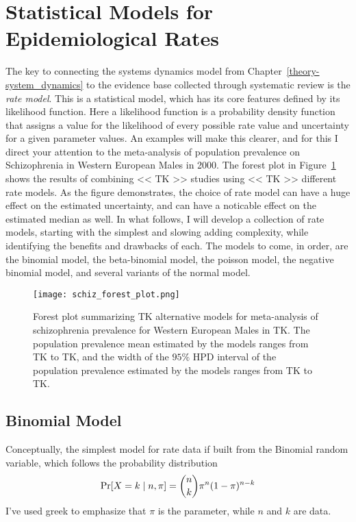 \section{Statistical Models for Epidemiological Rates}
\label{theory-rate_model}

The key to connecting the systems dynamics model from
Chapter~\ref{theory-system_dynamics} to the evidence base collected
through systematic review is the \emph{rate model}.  This is a
statistical model, which has its core features defined by its
likelihood function.  Here a likelihood function is a 
probability density function that assigns a value for the likelihood
of every possible rate value and uncertainty for a given parameter
values.  An examples will make this clearer, and for this I direct
your attention to the meta-analysis of
population prevalence on Schizophrenia in Western European Males in
2000.  The forest plot in
Figure~\ref{fig:theory-rate_model-schiz_forest} shows the results of
combining << TK >> studies using << TK >> different rate models.
As the figure demonstrates, the choice of rate model can have a huge effect
on the estimated uncertainty, and can have a noticable effect on the estimated
median as well. In what follows, I will develop a collection of rate models, starting with the
simplest and slowing adding complexity, while identifying the benefits
and drawbacks of each.  The models to come, in order, are the binomial model, the
beta-binomial model, the poisson model, the negative binomial model,
and several variants of the normal model.

\begin{figure}
\begin{center}
\texttt{[image: schiz\_forest\_plot.png]}
\end{center}
\caption{Forest plot summarizing TK alternative models for
  meta-analysis of schizophrenia prevalence for Western European Males
  in TK.  The population prevalence mean estimated by the models ranges from
  TK to TK, and the width of the $95\%$ HPD interval of the
  population prevalence estimated by the models ranges from TK
  to TK.}
\label{fig:theory-rate_model-schiz_forest}
\end{figure}

\subsection{Binomial Model}
Conceptually, the simplest model for rate data if built from the
Binomial random variable, which follows the probability distribution
\[
\operatorname{Pr}[X=k\;|\; n,\pi] = \binom{n}{k}\pi^n(1-\pi)^{n-k}
\]
I've used greek to emphasize that $\pi$ is the parameter, while $n$
and $k$ are data.


